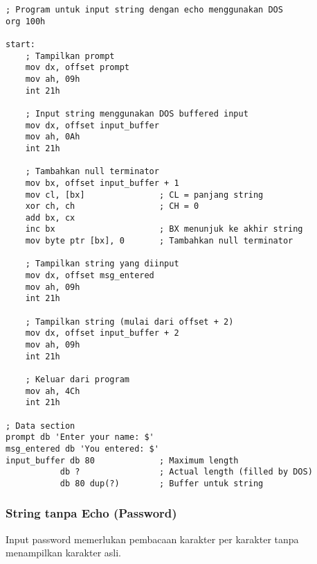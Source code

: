 \documentclass[../main.tex]{subfiles}
\begin{document}
\begin{lstlisting}[language={[x86masm]Assembler}, caption=Input String dengan Echo, label={lst:string-echo}]
; Program untuk input string dengan echo menggunakan DOS
org 100h

start:
    ; Tampilkan prompt
    mov dx, offset prompt
    mov ah, 09h
    int 21h
    
    ; Input string menggunakan DOS buffered input
    mov dx, offset input_buffer
    mov ah, 0Ah
    int 21h
    
    ; Tambahkan null terminator
    mov bx, offset input_buffer + 1
    mov cl, [bx]               ; CL = panjang string
    xor ch, ch                 ; CH = 0
    add bx, cx
    inc bx                     ; BX menunjuk ke akhir string
    mov byte ptr [bx], 0       ; Tambahkan null terminator
    
    ; Tampilkan string yang diinput
    mov dx, offset msg_entered
    mov ah, 09h
    int 21h
    
    ; Tampilkan string (mulai dari offset + 2)
    mov dx, offset input_buffer + 2
    mov ah, 09h
    int 21h
    
    ; Keluar dari program
    mov ah, 4Ch
    int 21h

; Data section
prompt db 'Enter your name: $'
msg_entered db 'You entered: $'
input_buffer db 80             ; Maximum length
           db ?                ; Actual length (filled by DOS)
           db 80 dup(?)        ; Buffer untuk string
\end{lstlisting}

            \subsubsection{String tanpa Echo (Password)}
Input password memerlukan pembacaan karakter per karakter tanpa menampilkan karakter asli.
\end{document}
